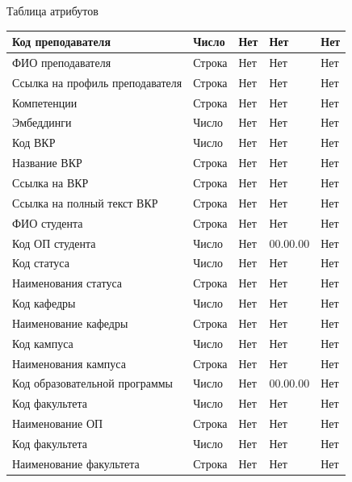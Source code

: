 \documentclass[PI,KR]{HSEUniversity}
\begin{document}
\begin{TABLE}[!h]{Таблица атрибутов \label{tbl:tableDB}}
\begin{tabular}[c]{|p{4cm}|l|p{3cm}|l|p{3cm}|}
		Код преподавателя 				& Число  & Нет & Нет 		& Нет \\ \hline
		ФИО преподавателя 				& Строка & Нет & Нет 		& Нет \\ \hline	
		Ссылка на профиль преподавателя & Строка & Нет & Нет 		& Нет \\ \hline
		Компетенции 					& Строка & Нет & Нет 		& Нет \\ \hline
		Эмбеддинги 						& Число  & Нет & Нет 		& Нет \\ \hline
		Код ВКР 						& Число  & Нет & Нет 		& Нет \\ \hline
		Название ВКР 					& Строка & Нет & Нет 		& Нет \\ \hline
		Ссылка на ВКР 					& Строка & Нет & Нет 		& Нет \\ \hline
		Ссылка на полный текст ВКР 		& Строка & Нет & Нет 		& Нет \\ \hline
		ФИО студента 					& Строка & Нет & Нет 		& Нет \\ \hline
		Код ОП студента 				& Число  & Нет & 00.00.00	& Нет \\ \hline
		Код статуса 					& Число  & Нет & Нет		& Нет \\ \hline
		Наименования статуса 			& Строка & Нет & Нет 		& Нет \\ \hline
		Код кафедры 					& Число  & Нет & Нет 		& Нет \\ \hline
		Наименование кафедры 			& Строка & Нет & Нет 		& Нет \\ \hline
		Код кампуса 					& Число  & Нет & Нет 		& Нет \\ \hline
		Наименования кампуса 			& Строка & Нет & Нет 		& Нет \\ \hline
		Код образовательной программы 	& Число  & Нет & 00.00.00 	& Нет \\ \hline
		Код факультета		 			& Число  & Нет & Нет 		& Нет \\ \hline
		Наименование ОП 				& Строка & Нет & Нет	 	& Нет \\ \hline
		Код факультета 					& Число  & Нет & Нет 		& Нет \\ \hline
		Наименование факультета 		& Строка & Нет & Нет 		& Нет \\ \hline
	\end{tabular}
\end{TABLE}
\end{document}
